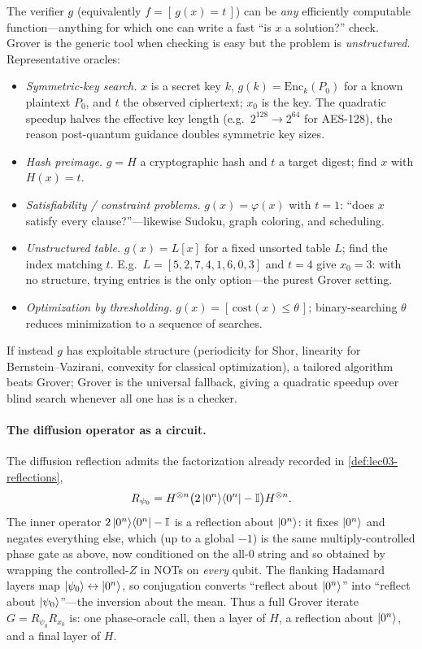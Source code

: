 \begin{remark}
\label{rem:lec03-oracle-examples}
The verifier $g$ (equivalently $f=[\,g(x)=t\,]$) can be \emph{any} efficiently
computable function---anything for which one can write a fast ``is $x$ a solution?''
check. Grover is the generic tool when checking is easy but the problem is
\emph{unstructured}. Representative oracles:
\begin{itemize}[leftmargin=1.4em,itemsep=1pt,topsep=2pt]
  \item \emph{Symmetric-key search.} $x$ is a secret key $k$, $g(k)=\mathrm{Enc}_k(P_0)$
        for a known plaintext $P_0$, and $t$ the observed ciphertext; $x_0$ is the key.
        The quadratic speedup halves the effective key length (e.g.\ $2^{128}\!\to\!2^{64}$
        for AES-128), the reason post-quantum guidance doubles symmetric key sizes.
  \item \emph{Hash preimage.} $g=H$ a cryptographic hash and $t$ a target digest; find
        $x$ with $H(x)=t$.
  \item \emph{Satisfiability / constraint problems.} $g(x)=\varphi(x)$ with $t=1$:
        ``does $x$ satisfy every clause?''---likewise Sudoku, graph coloring, and
        scheduling.
  \item \emph{Unstructured table.} $g(x)=L[x]$ for a fixed unsorted table $L$; find the
        index matching $t$. E.g.\ $L=[5,2,7,4,1,6,0,3]$ and $t=4$ give $x_0=3$: with no
        structure, trying entries is the only option---the purest Grover setting.
  \item \emph{Optimization by thresholding.} $g(x)=[\,\mathrm{cost}(x)\le\theta\,]$;
        binary-searching $\theta$ reduces minimization to a sequence of searches.
\end{itemize}
If instead $g$ has exploitable structure (periodicity for Shor, linearity for
Bernstein--Vazirani, convexity for classical optimization), a tailored algorithm beats
Grover; Grover is the universal fallback, giving a quadratic speedup over blind search
whenever all one has is a checker.
\end{remark}

\paragraph{The diffusion operator as a circuit.}
The diffusion reflection admits the factorization already recorded in
\cref{def:lec03-reflections},
\[
  R_{\psi_0}=H^{\otimes n}\bigl(2\ket{0^{n}}\!\bra{0^{n}}-\mathbb{I}\bigr)H^{\otimes n}.
\]
The inner operator $2\ket{0^n}\!\bra{0^n}-\mathbb{I}$ is a reflection about $\ket{0^n}$: it fixes
$\ket{0^n}$ and negates everything else, which (up to a global $-1$) is the same
multiply-controlled phase gate as above, now conditioned on the all-$0$ string and
so obtained by wrapping the controlled-$Z$ in NOTs on \emph{every} qubit. The
flanking Hadamard layers map $\ket{\psi_0}\leftrightarrow\ket{0^n}$, so conjugation
converts ``reflect about $\ket{0^n}$'' into ``reflect about $\ket{\psi_0}$''---the
inversion about the mean. Thus a full Grover iterate $G=R_{\psi_0}R_{x_0}$ is: one
phase-oracle call, then a layer of $H$, a reflection about $\ket{0^n}$, and a final
layer of $H$.

